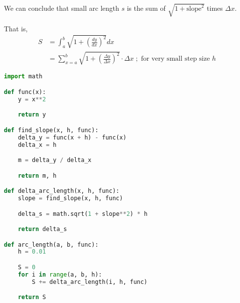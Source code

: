 \documentclass[11pt]{article}
\begin{document}
We can conclude that small arc length \(s\) is the sum of  \(\sqrt{1 + \text{slope}^2}\) times \(\Delta x\).

That is,
\[
\begin{aligned}
    S &= \int_a^b \sqrt{1 + \left( \frac{dy}{dx} \right)^2} dx \\
    &= \sum_{x=a}^b \sqrt{1 + \left( \frac{\Delta y}{ \Delta x} \right)^2} \cdot \Delta x \; ; \text{ for very small step size } h
\end{aligned}
\]

\begin{lstlisting}[language=Python]
import math

def func(x):
    y = x**2

    return y

def find_slope(x, h, func):
    delta_y = func(x + h) - func(x)
    delta_x = h

    m = delta_y / delta_x

    return m, h

def delta_arc_length(x, h, func):
    slope = find_slope(x, h, func)

    delta_s = math.sqrt(1 + slope**2) * h

    return delta_s

def arc_length(a, b, func):
    h = 0.01

    S = 0
    for i in range(a, b, h):
        S += delta_arc_length(i, h, func)

    return S
    
\end{lstlisting}
\end{document}

